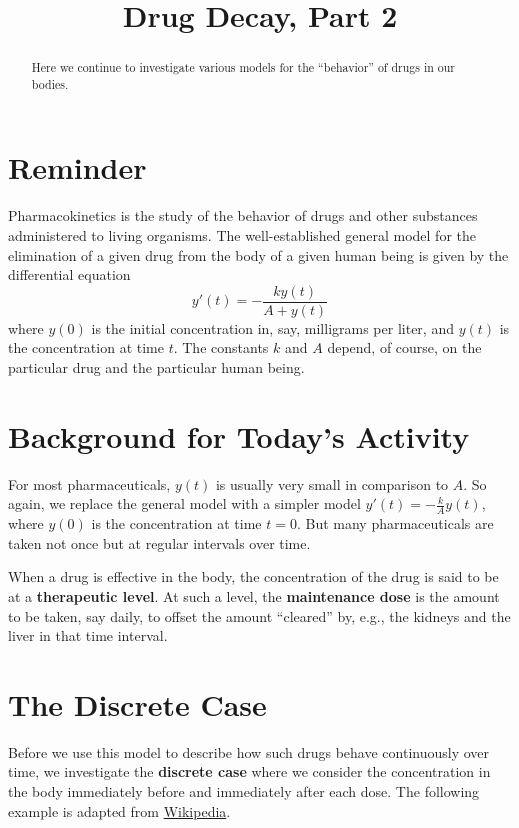 \documentclass{ximera}
\title{Drug Decay, Part 2}
\begin{document}
\begin{abstract}
Here we continue to investigate various models for the ``behavior'' of drugs in our bodies.  
\end{abstract}
\maketitle

\section{Reminder}
Pharmacokinetics is the study of the behavior of drugs and other substances administered to living organisms.  
The well-established general model for 
the elimination of a given drug from the body of a given human being is given by the differential equation 
$$y'(t)=-\frac{ky(t)}{A+y(t)}$$
where $y(0)$ is the initial concentration in, say, milligrams per liter, and $y(t)$ is the concentration at time $t$.  The constants $k$ and $A$ depend, of course, on the particular drug and the particular human being. 


\section{Background for Today's Activity}
For most pharmaceuticals, $y(t)$ is usually very small in comparison
to $A$.  So again, we replace the general model with a simpler model
$y'(t)=-\frac{k}{A}y(t)$, where $y(0)$ is the concentration at time
$t=0$.  But many pharmaceuticals are taken not once but at regular
intervals over time.

When a drug is effective in the body, the concentration of the drug is
said to be at a \textbf{therapeutic level}.  At such a level, the
\textbf{maintenance dose} is the amount to be taken, say daily, to
offset the amount ``cleared'' by, e.g., the kidneys and the liver in
that time interval.

\section{The Discrete Case}
Before we use this model to describe how such drugs behave
continuously over time, we investigate the \textbf{discrete case}
where we consider the concentration in the body immediately before and
immediately after each dose.  The following example is adapted from
\href{http://en.wikipedia.org/wiki/Loading_dose}{Wikipedia}.
\end{document}
